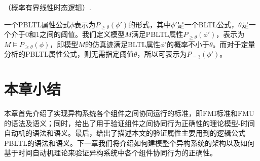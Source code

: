 \begin{define}\label{def:pbltl}
（概率有界线性时态逻辑）.

一个PBLTL属性公式$\phi$表示为$P_{\geq \theta}(\phi')$的形式，其中$\phi'$是一个BLTL公式，$\theta$是一个介于0和1之间的阈值。我们定义模型$M$满足PBLTL属性$P_{\geq \theta}(\phi')$，表示为$M \models P_{\geq \theta}(\phi)$，即模型$M$的仿真迹满足BLTL属性$\phi'$的概率不小于$\theta$。而对于定量分析的PBLTL属性公式，则无需指定阈值$\theta$，所以可表示为$P_{=?}(\phi')$。
\end{define}


\section{本章小结}
本章首先介绍了实现异构系统各个组件之间协同运行的标准，即FMI标准和FMU的语法及语义；同时，给出了用于验证组件之间协同行为正确性的理论模型-时间自动机的语法和语义。最后，给出了描述本文的验证属性主要用到的逻辑公式PBLTL的语法和语义。下一章我们将介绍如何建模整个异构系统的架构以及如何基于时间自动机理论来验证异构系统中各个组件协同行为的正确性。
